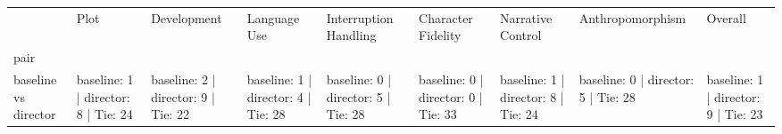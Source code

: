 \begin{tabular}{lllllllll}
\toprule
 & Plot & Development & Language Use & Interruption Handling & Character Fidelity & Narrative Control & Anthropomorphism & Overall \\
pair &  &  &  &  &  &  &  &  \\
\midrule
baseline vs director & baseline: 1 | director: 8 | Tie: 24 & baseline: 2 | director: 9 | Tie: 22 & baseline: 1 | director: 4 | Tie: 28 & baseline: 0 | director: 5 | Tie: 28 & baseline: 0 | director: 0 | Tie: 33 & baseline: 1 | director: 8 | Tie: 24 & baseline: 0 | director: 5 | Tie: 28 & baseline: 1 | director: 9 | Tie: 23 \\
\bottomrule
\end{tabular}
